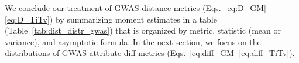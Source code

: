 \documentclass[aoas]{imsart}
\begin{document}
We conclude our treatment of GWAS distance metrics (Eqs.~\ref{eq:D_GM}-\ref{eq:D_TiTv}) by summarizing moment estimates in a table (Table~\ref{tab:dist_distr_gwas}) that is organized by metric, statistic (mean or variance), and asymptotic formula. In the next section, we focus on the distributions of GWAS attribute diff metrics (Eqs.~\ref{eq:diff_GM}-\ref{eq:diff_TiTv}).


%
\end{document}
